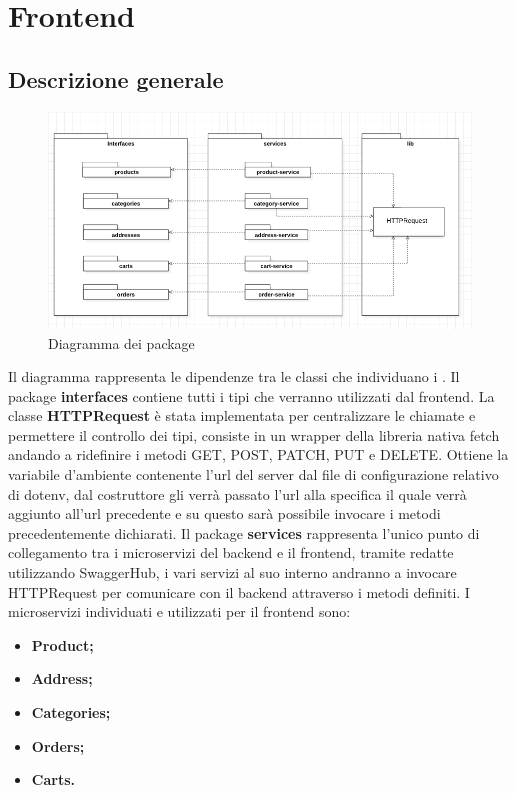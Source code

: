 \newpage
\section{Frontend}\label{Frontend}
\subsection{Descrizione generale}
\begin{figure}[H]
	\centering
	\includegraphics[scale=0.6]{Immagini/Frontend/DiagrammadeiPackage.png}
	\caption{Diagramma dei package}
	\label{fig:fe-packages}
\end{figure}
Il diagramma rappresenta le dipendenze tra le classi che individuano i .
Il package \textbf{interfaces} contiene tutti i tipi che verranno utilizzati dal frontend.
La classe \textbf{HTTPRequest} è stata implementata per centralizzare le chiamate  e permettere il controllo dei tipi, consiste in un wrapper della libreria nativa fetch andando a ridefinire i metodi GET, POST, PATCH, PUT e DELETE. Ottiene la variabile d'ambiente contenente l'url del server dal file di configurazione relativo di dotenv, dal costruttore gli verrà passato l'url alla specifica  il quale verrà aggiunto all'url precedente e su questo sarà possibile invocare i metodi precedentemente dichiarati.
Il package \textbf{services} rappresenta l'unico punto di collegamento tra i microservizi del backend e il frontend, tramite  redatte utilizzando SwaggerHub, i vari servizi al suo interno andranno a invocare HTTPRequest per comunicare con il backend attraverso i metodi definiti.
I microservizi individuati e utilizzati per il frontend sono:
\begin{itemize}
	\item \textbf{Product;}
	\item \textbf{Address;}
	\item \textbf{Categories;}
	\item \textbf{Orders;}
	\item \textbf{Carts.}
\end{itemize}
